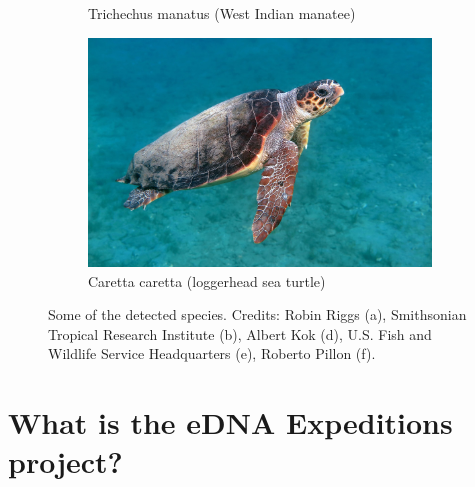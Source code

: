 \documentclass[10pt]{article}
\begin{document}
\begin{figure}[h]
\begin{subfigure}[b]{0.48\textwidth}
         \caption{Trichechus manatus (West Indian manatee)}
     \end{subfigure}
     \hfill
     \begin{subfigure}[b]{0.48\textwidth}
         \centering
         \includegraphics[width=\textwidth]{images/caretta_caretta.jpg}
         \caption{Caretta caretta (loggerhead sea turtle)}
     \end{subfigure}
     \caption{Some of the detected species. Credits: Robin Riggs (a), Smithsonian Tropical Research Institute (b), Albert Kok (d), U.S. Fish and Wildlife Service Headquarters (e), Roberto Pillon (f).}
\end{figure}

\clearpage

\section*{What is the eDNA Expeditions project?}
\end{document}
